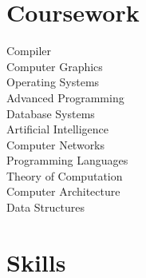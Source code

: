 \documentclass[]{deedy-resume-openfont}
\begin{document}
\begin{minipage}[t]{0.33\textwidth}



\section{Coursework}

Compiler \\
Computer Graphics \\
Operating Systems  \\
Advanced Programming \\
Database Systems \\
Artificial Intelligence \\
Computer Networks \\
Programming Languages \\
Theory of Computation \\
Computer Architecture \\
Data Structures \\
\sectionsep


\section{Skills}

\end{minipage}
\end{document}
